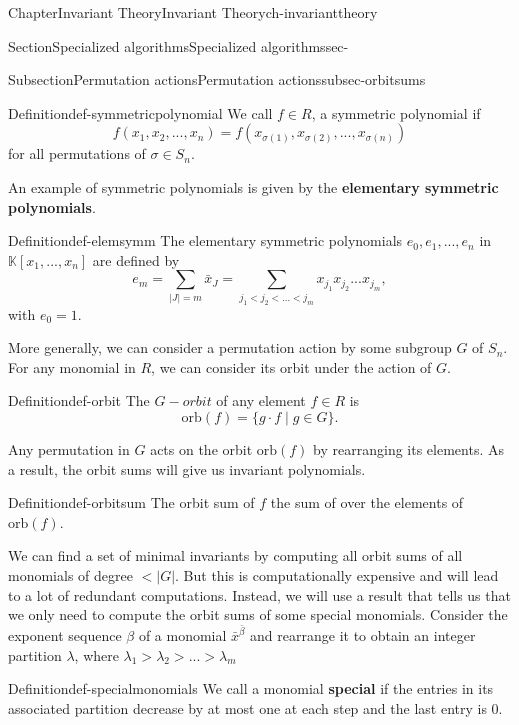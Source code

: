 \documentclass[oneside,10pt,]{book}
\newcommand{\terminology}[1]{\textbf{#1}}
\newcommand{\lt}{<}
\newcommand{\gt}{>}
\begin{document}
\begin{chapterptx}{Chapter}{Invariant Theory}{}{Invariant Theory}{}{}{ch-invarianttheory}
\begin{sectionptx}{Section}{Specialized algorithms}{}{Specialized algorithms}{}{}{sec-}
\begin{subsectionptx}{Subsection}{Permutation actions}{}{Permutation actions}{}{}{subsec-orbitsums}
\begin{definition}{Definition}{}{def-symmetricpolynomial}
We call \(f \in R\), a symmetric polynomial if%
\begin{equation*}
f(x_1,x_2,...,x_n) = f(x_{\sigma(1)},x_{\sigma(2)},...,x_{\sigma(n)})
\end{equation*}
for all permutations of \(\sigma \in S_n\).%
\end{definition}
An example of symmetric polynomials is given by the \terminology{elementary symmetric polynomials}.%
\begin{definition}{Definition}{}{def-elemsymm}%
The elementary symmetric polynomials \(e_0,e_1,...,e_n\) in \(\mathbb{K}[x_1,...,x_n]\) are defined by%
\begin{equation*}
e_{m}=\sum_{|J|=m} \bar x_J = \sum_{j_1 \lt j_2 \lt ... \lt j_m} x_{j_1}x_{j_2}...x_{j_m}, 
\end{equation*}
with \(e_0=1\).%
\end{definition}
More generally, we can consider a permutation action by some subgroup \(G\) of \(S_n\). For any monomial in \(R\), we can consider its orbit under the action of \(G\).%
\begin{definition}{Definition}{}{def-orbit}%
The \(G-orbit\) of any element \(f \in R\) is%
\begin{equation*}
\text{orb}(f) = \{g \cdot f \mid g \in G\}\text{.}
\end{equation*}
%
\end{definition}
Any permutation in \(G\) acts on the orbit \(\text{orb}(f)\) by rearranging its elements. As a result, the orbit sums will give us invariant polynomials.%
\begin{definition}{Definition}{}{def-orbitsum}%
The orbit sum of \(f\) the sum of over the elements of  \(\text{orb}(f)\).%
\end{definition}
We can find a set of minimal invariants by computing all orbit sums of all monomials of degree \(\lt |G|\). But this is computationally expensive and will lead to a lot of redundant computations. Instead, we will use a result that tells us that we only need to compute the orbit sums of some special monomials. Consider the exponent sequence \(\beta\) of a monomial \(\bar x^{\bar \beta}\) and rearrange it to obtain an integer partition \(\lambda\), where \(\lambda_1 \gt \lambda_2 \gt ... \gt \lambda_m\)%
\begin{definition}{Definition}{}{def-specialmonomials}%
We call a monomial \terminology{special} if the entries in its associated partition decrease by at most one at each step and the last entry is 0.%
\end{definition}

\end{subsectionptx}
\end{sectionptx}
\end{chapterptx}
\end{document}
